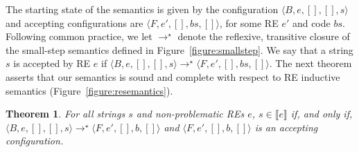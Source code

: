 \documentclass[sigplan]{acmart}
\newtheorem{Theorem}{Theorem}
\theoremstyle{definition}
\newcommand{\sembrackets}[1]{\ensuremath{\llbracket #1 \rrbracket}}
\newcommand{\conf}[1]{\ensuremath{\langle #1 \rangle}}
\begin{document}
The starting state of the semantics is given by the configuration
$\conf{B,e,[],[],s}$ and accepting configurations are $\conf{F,e',[],bs,[]}$, for some RE $e'$ and code $bs$.
Following common practice, we let $\to^\star$ denote the reflexive, transitive closure of the small-step
semantics defined in Figure~\ref{figure:smallstep}.
We say that a string $s$ is accepted by RE $e$ if $\conf{B,e,[],[],s}\to^\star\conf{F,e',[],bs,[]}$.
The next theorem asserts that our semantics is sound and complete with respect to RE
inductive semantics (Figure~\ref{figure:resemantics}).

\begin{Theorem}
   For all strings $s$ and non-problematic REs $e$, $s\in\sembrackets{e}$ if, and only if, $\conf{B,e,[],[],s}\to^\star\conf{F,e',[],b,[]}$ and
   $\conf{F,e',[],b,[]}$ is an accepting configuration.
\end{Theorem}
\end{document}

